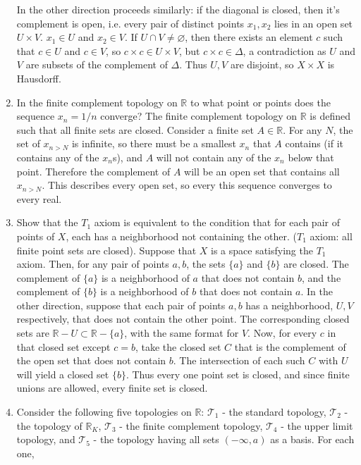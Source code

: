 \documentclass[12pt,letterpaper]{article}
\newcommand{\n}{\break}
\let\emptyset\varnothing
\newcommand{\T}{\ensuremath{\mathcal{T}}}
\begin{document}
\begin{enumerate}
  \indent In the other direction proceeds similarly: if the diagonal is closed, then it's complement is open, i.e. every pair of distinct points $x_1,x_2$ lies in an open set $U\times V$. $x_1\in U$ and $x_2\in V$. If $U\cap V\neq \emptyset$, then there exists an element $c$ such that $c\in U$ and $c\in V$, so $c\times c\in U\times V$, but $c\times c\in \Delta$, a contradiction as $U$ and $V$ are subsets of the complement of $\Delta$. Thus $U,V$ are disjoint, so $X\times X$ is Hausdorff.
  \item In the finite complement topology on $\mathbb{R}$ to what point or points does the sequence $x_n=1/n$ converge?\hspace{5in}\n
  \indent The finite complement topology on $\mathbb{R}$ is defined such that all finite sets are closed. Consider a finite set $A\in\mathbb{R}$. For any $N$, the set of $x_{n>N}$ is infinite, so there must be a smallest $x_n$ that $A$ contains (if it contains any of the $x_n$s), and $A$ will not contain any of the $x_n$ below that point. Therefore the complement of $A$ will be an open set that contains all $x_{n>N}$. This describes every open set, so every this sequence converges to every real.
  \item Show that the $T_1$ axiom is equivalent to the condition that for each pair of points of $X$, each has a neighborhood not containing the other. ($T_1$ axiom: all finite point sets are closed). \n
  \indent Suppose that $X$ is a space satisfying the $T_1$ axiom. Then, for any pair of points $a,b$, the sets $\{a\}$ and $\{b\}$ are closed. The complement of $\{a\}$ is a neighborhood of $a$ that does not contain $b$, and the complement of $\{b\}$ is a neighborhood of $b$ that does not contain $a$.\n
  \indent In the other direction, suppose that each pair of points $a,b$ has a neighborhood, $U,V$ respectively, that does not contain the other point. The corresponding closed sets are $\mathbb{R}-U\subset \mathbb{R}-\{a\}$, with the same format for $V$. Now, for every $c$ in that closed set except $c=b$, take the closed set $C$ that is the complement of the open set that does not contain $b$. The intersection of each such $C$ with $U$ will yield a closed set $\{b\}$. Thus every one point set is closed, and since finite unions are allowed, every finite set is closed.
  \item Consider the following five topologies on $\mathbb{R}$: $\T_1$ - the standard topology, $\T_2$ - the topology of $\mathbb{R}_K$, $\T_3$ - the finite complement topology, $\T_4$ - the upper limit topology, and $\T_5$ - the topology having all sets $(-\infty,a)$ as a basis. For each one, 

\end{enumerate}
\end{document}
